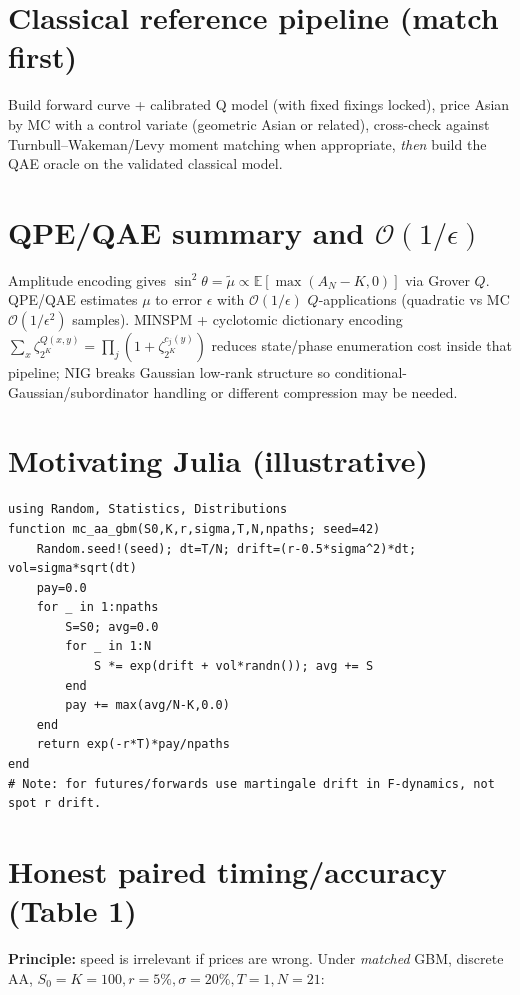\documentclass[11pt,a4paper]{article}
\begin{document}
\section{Classical reference pipeline (match first)}
Build forward curve + calibrated Q model (with fixed fixings locked), price Asian by MC with a control variate (geometric Asian or related), cross-check against Turnbull--Wakeman/Levy moment matching when appropriate, \emph{then} build the QAE oracle on the validated classical model.

\section{QPE/QAE summary and \texorpdfstring{$\mathcal{O}(1/\epsilon)$}{O(1/eps)}}
Amplitude encoding gives $\sin^2\theta=\tilde\mu\propto \mathbb{E}[\max(A_N-K,0)]$ via Grover $Q$. QPE/QAE estimates $\mu$ to error $\epsilon$ with $\mathcal{O}(1/\epsilon)$ $Q$-applications (quadratic vs MC $\mathcal{O}(1/\epsilon^2)$ samples). MINSPM + cyclotomic dictionary encoding $\sum_x \zeta_{2^K}^{Q(x,y)}=\prod_j (1+\zeta_{2^K}^{c_j(y)})$ reduces state/phase enumeration cost inside that pipeline; NIG breaks Gaussian low-rank structure so conditional-Gaussian/subordinator handling or different compression may be needed.

\section{Motivating Julia (illustrative)}
\begin{lstlisting}
using Random, Statistics, Distributions
function mc_aa_gbm(S0,K,r,sigma,T,N,npaths; seed=42)
    Random.seed!(seed); dt=T/N; drift=(r-0.5*sigma^2)*dt; vol=sigma*sqrt(dt)
    pay=0.0
    for _ in 1:npaths
        S=S0; avg=0.0
        for _ in 1:N
            S *= exp(drift + vol*randn()); avg += S
        end
        pay += max(avg/N-K,0.0)
    end
    return exp(-r*T)*pay/npaths
end
# Note: for futures/forwards use martingale drift in F-dynamics, not spot r drift.
\end{lstlisting}

\section{Honest paired timing/accuracy (Table 1)}
\textbf{Principle:} speed is irrelevant if prices are wrong. Under \emph{matched} GBM, discrete AA, $S_0{=}K{=}100,r{=}5\%,\sigma{=}20\%,T{=}1,N{=}21$:
\end{document}
